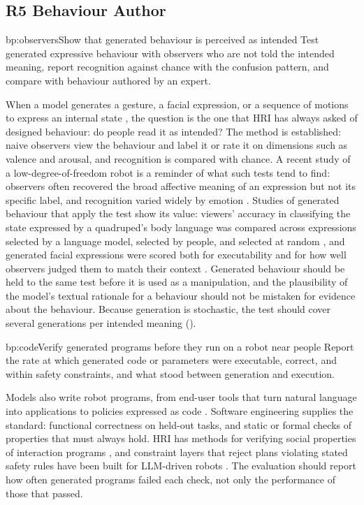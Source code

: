 \subsection{R5 Behaviour Author}

\begin{practice}{bp:observers}{Show that generated behaviour is perceived as intended}
Test generated expressive behaviour with observers who are not told the
intended meaning, report recognition against chance with the confusion
pattern, and compare with behaviour authored by an expert.
\end{practice}

When a model generates a gesture, a facial expression, or a sequence of
motions to express an internal state \cite{mahadevan2024generative,
antony2025xpress}, the question is the one that HRI has always asked of
designed behaviour: do people read it as intended? The method is established:
naive observers view the behaviour and label it or rate it on dimensions such
as valence and arousal, and recognition is compared with chance. A recent
study of a low-degree-of-freedom robot is a reminder of what such tests tend
to find: observers often recovered the broad affective meaning of an
expression but not its specific label, and recognition varied widely by
emotion \cite{rogel2026emotional}. Studies of generated behaviour that apply the
test show its value: viewers' accuracy in classifying the state expressed
by a quadruped's body language was compared across expressions selected by
a language model, selected by people, and selected at random
\cite{roy2025gpt}, and generated facial expressions were scored both for
executability and for how well observers judged them to match their context
\cite{antony2025xpress}. Generated behaviour should be held to the
same test before it is used as a manipulation, and the plausibility of the
model's textual rationale for a behaviour should not be mistaken for evidence
about the behaviour. Because generation is stochastic, the test should cover
several generations per intended meaning ().

\begin{practice}{bp:code}{Verify generated programs before they run on a robot near people}
Report the rate at which generated code or parameters were executable,
correct, and within safety constraints, and what stood between generation and
execution.
\end{practice}

Models also write robot programs, from end-user tools that turn natural
language into applications \cite{karli2024alchemist} to policies expressed as
code \cite{liang2023code}. Software engineering supplies the standard:
functional correctness on held-out tasks, and static or formal checks of
properties that must always hold. HRI has methods for verifying social
properties of interaction programs \cite{porfirio2018authoring}, and
constraint layers that reject plans violating stated safety rules have been
built for LLM-driven robots \cite{yang2024plug}. The evaluation should report
how often generated programs failed each check, not only the performance of
those that passed.

